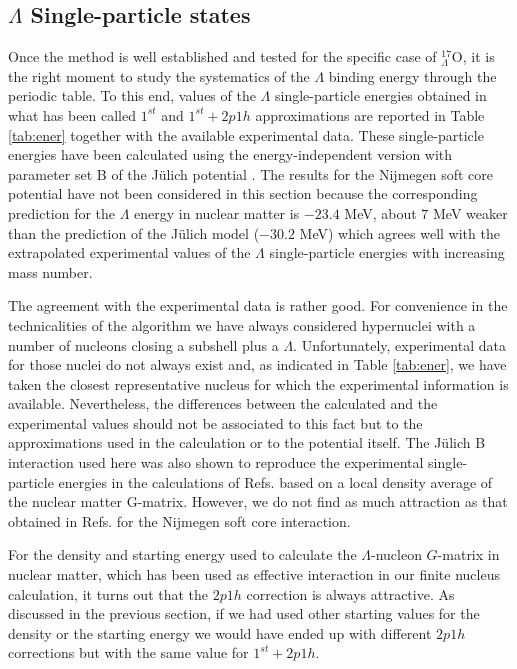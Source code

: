 \subsection{$\Lambda$ Single-particle states}
\label{results2}

Once the method is well established and tested for the specific case
of $_{\Lambda}^{17}$O, it is the right moment to study the systematics of the 
$\Lambda$ binding energy through the periodic table. 
To this end, values of the $\Lambda$ single-particle energies
 obtained in what has
been called $1^{st}$ and $1^{st}+2p1h$ approximations are reported in
Table \ref{tab:ener} together with the available experimental data.
These single-particle energies have been
calculated using the energy-independent version with parameter set B
of the J\"ulich potential \cite{juelich}. The results for the Nijmegen
soft core potential \cite{nijmegen} have
not been considered in this section because the corresponding prediction
for the
$\Lambda$ energy in nuclear matter is $-23.4$ MeV,
about $7$ MeV weaker than the prediction of the J\"ulich model
($-30.2$ MeV) which agrees well with the extrapolated experimental values
 of the $\Lambda$
single-particle energies with increasing mass number.

The agreement with the experimental data is rather good.  
For convenience in the technicalities of the algorithm we have always
considered 
hypernuclei with a number of nucleons closing a subshell plus a $\Lambda$. 
Unfortunately, experimental data for those nuclei do not always exist and, 
as indicated in Table \ref{tab:ener},
we have
taken the closest representative nucleus for which the experimental information is
available. Nevertheless, the differences between the calculated and the
experimental values should 
not be associated to this fact but to the approximations used in the calculation
or to the potential itself. 
The J\"ulich B interaction used here was also shown to reproduce the
experimental single-particle energies in the calculations of Refs.
\cite{yama92,yama94} based on a local density average of the
nuclear matter G-matrix. However, we do not find as much
attraction as that obtained in Refs. \cite{yama92,yama94} for the
Nijmegen soft core interaction.


 For the density and starting energy used to
calculate the $\Lambda$-nucleon $G$-matrix in nuclear matter, which
has been used as effective interaction in our finite nucleus
calculation, it turns out that the $2p1h$ correction is always
attractive. As
discussed in the previous section, if we had used other starting
values for the density or the starting energy  we would have ended up
with different $2p1h$ corrections but with the same value for
$1^{st}+2p1h$.

